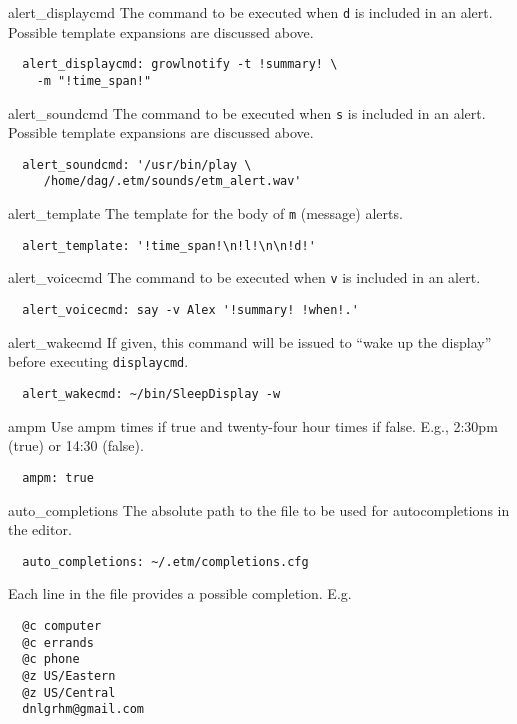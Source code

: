 \documentclass[9pt,landscape]{article}
\begin{document}
\begin{multicols}{3}
\begin{compactdesc}
\item[alert\_displaycmd] The command to be executed when \verb'd' is included in an alert. Possible template expansions are discussed above.
\begin{verbatim}
  alert_displaycmd: growlnotify -t !summary! \
    -m "!time_span!"
\end{verbatim}

\item[alert\_soundcmd] The command to be executed when \verb's' is included in an alert. Possible template expansions are discussed above.
\begin{verbatim}
  alert_soundcmd: '/usr/bin/play \
     /home/dag/.etm/sounds/etm_alert.wav'
\end{verbatim}

\item[alert\_template] The template for the body of \verb'm' (message) alerts.
\begin{verbatim}
  alert_template: '!time_span!\n!l!\n\n!d!'
\end{verbatim}

\item[alert\_voicecmd] The command to be executed when \verb'v' is included in an alert.
\begin{verbatim}
  alert_voicecmd: say -v Alex '!summary! !when!.'
\end{verbatim}

\item[alert\_wakecmd] If given, this command will be issued to ``wake up the display'' before executing \verb'displaycmd'.
\begin{verbatim}
  alert_wakecmd: ~/bin/SleepDisplay -w
\end{verbatim}

\item[ampm] Use ampm times if true and twenty-four hour times if false. E.g., 2:30pm (true) or 14:30 (false).
\begin{verbatim}
  ampm: true
\end{verbatim}

\item[auto\_completions] The absolute path to the file to be used for autocompletions in the editor.
\begin{verbatim}
  auto_completions: ~/.etm/completions.cfg
\end{verbatim}
Each line in the file provides a possible completion. E.g.
\begin{verbatim}
  @c computer
  @c errands
  @c phone
  @z US/Eastern
  @z US/Central
  dnlgrhm@gmail.com
\end{verbatim}


\end{compactdesc}
\end{multicols}
\end{document}
